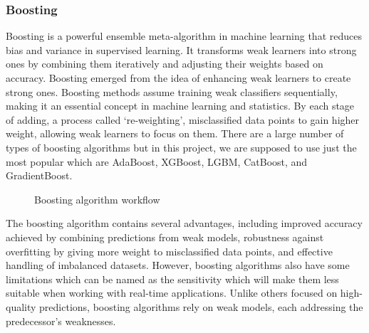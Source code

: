 \subsubsection{Boosting}
Boosting is a powerful ensemble meta-algorithm in machine learning that reduces bias and variance in supervised learning. It transforms weak learners into strong ones by combining them iteratively and adjusting their weights based on accuracy. Boosting emerged from the idea of enhancing weak learners to create strong ones. Boosting methods assume training weak classifiers sequentially, making it an essential concept in machine learning and statistics. By each stage of adding, a process called ‘re-weighting’, misclassified data points to gain higher weight, allowing weak learners to focus on them. There are a large number of types of boosting algorithms but in this project, we are supposed to use just the most popular which are AdaBoost, XGBoost, LGBM, CatBoost, and GradientBoost. 


\begin{figure}[h]
\centering
\caption{Boosting algorithm workflow} \label{fig:Boost_workflow}
\end{figure}


The boosting algorithm contains several advantages, including improved accuracy achieved by combining predictions from weak models, robustness against overfitting by giving more weight to misclassified data points, and effective handling of imbalanced datasets. However, boosting algorithms also have some limitations which can be named as the sensitivity which will make them less suitable when working with real-time applications. Unlike others focused on high-quality predictions, boosting algorithms rely on weak models, each addressing the predecessor’s weaknesses. 


